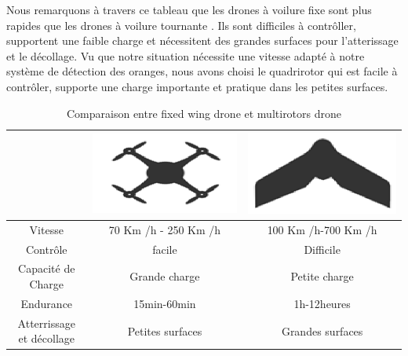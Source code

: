 	Nous remarquons à travers ce tableau que les drones à voilure fixe sont plus rapides que les drones à voilure tournante  . Ils sont difficiles à contrôller, supportent une faible charge et nécessitent des grandes surfaces pour l'atterissage et le décollage.
    Vu que notre situation nécessite une vitesse adapté à notre système de détection des oranges, nous avons choisi le quadrirotor qui est facile à contrôler, supporte une charge importante et pratique dans les petites surfaces.      
	\begin{table}[h]
		\begin{center}
			\caption{Comparaison entre fixed wing drone et multirotors drone	 }
			\begin{tabular}{|c|c|c|}
				\hline
				\centering
				& 
				\includegraphics[scale=0.2]{Images/Quadrirotor}
				&
				\includegraphics[scale=0.2]{Images/Ailed fixed}\\
				
				\hline
				Vitesse & 70 Km /h - 250 Km /h & 100 Km /h-700 Km /h  \\
				\hline
				Contrôle	& facile &	Difficile \\
				\hline
				Capacité de Charge &	Grande charge &	Petite charge \\
				\hline
				Endurance &	15min-60min & 1h-12heures \\
				\hline
				Atterrissage et décollage &	Petites surfaces &	Grandes surfaces \\
				\hline
			\end{tabular}
		\end{center}
	\end{table}
\newpage
	
